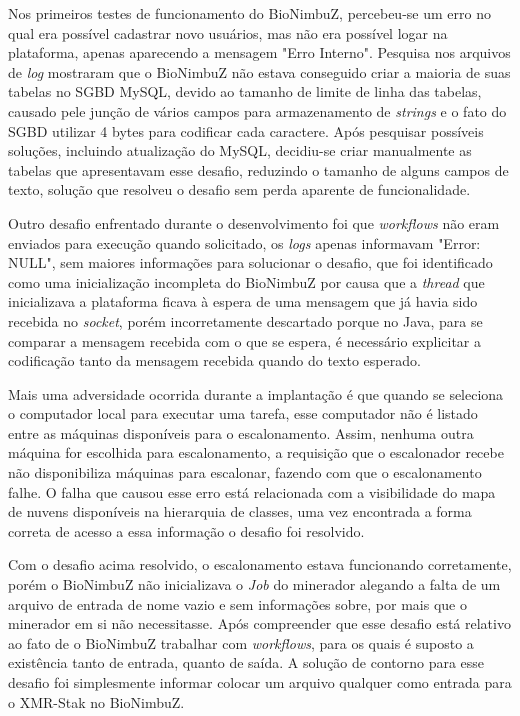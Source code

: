 Nos primeiros testes de funcionamento do BioNimbuZ, percebeu-se um erro no qual era possível cadastrar novo usuários, mas não era possível logar na plataforma, apenas aparecendo a mensagem "Erro Interno". Pesquisa nos arquivos de \textit{log} mostraram que o BioNimbuZ não estava conseguido criar a maioria de suas tabelas no \acrfull{SGBD} MySQL, devido ao tamanho de limite de linha das tabelas, causado pele junção de vários campos para armazenamento de \textit{strings} e o fato do \acrshort{SGBD} utilizar 4 bytes para codificar cada caractere. Após pesquisar possíveis soluções, incluindo atualização do MySQL, decidiu-se criar manualmente as tabelas que apresentavam esse desafio, reduzindo o tamanho de alguns campos de texto, solução que resolveu o desafio sem perda aparente de funcionalidade.

Outro desafio enfrentado durante o desenvolvimento foi que \textit{workflows} não eram enviados para execução quando solicitado, os \textit{logs} apenas informavam "Error: NULL", sem maiores informações para solucionar o desafio, que foi identificado como uma inicialização incompleta do BioNimbuZ por causa que a \textit{thread} que inicializava a plataforma ficava à espera de uma mensagem que já havia sido recebida no \textit{socket}, porém incorretamente descartado porque no Java, para se comparar a mensagem recebida com o que se espera, é necessário explicitar a codificação tanto da mensagem recebida quando do texto esperado.

Mais uma adversidade ocorrida durante a implantação é que quando se seleciona o computador local para executar uma tarefa, esse computador não é listado entre as máquinas disponíveis para o escalonamento. Assim, nenhuma outra máquina for escolhida para escalonamento, a requisição que o escalonador recebe não disponibiliza máquinas para escalonar, fazendo com que o escalonamento falhe. O falha que causou esse erro está relacionada com a visibilidade do mapa de nuvens disponíveis na hierarquia de classes, uma vez encontrada a forma correta de acesso a essa informação o desafio foi resolvido.

Com o desafio acima resolvido, o escalonamento estava funcionando corretamente, porém o BioNimbuZ não inicializava o \textit{Job} do minerador alegando a falta de um arquivo de entrada de nome vazio e sem informações sobre, por mais que o minerador em si não necessitasse. Após compreender que esse desafio está relativo ao fato de o BioNimbuZ trabalhar com \textit{workflows}, para os quais é suposto a existência tanto de entrada, quanto de saída. A solução de contorno para esse desafio foi simplesmente informar colocar um arquivo qualquer como entrada para o XMR-Stak no BioNimbuZ.

